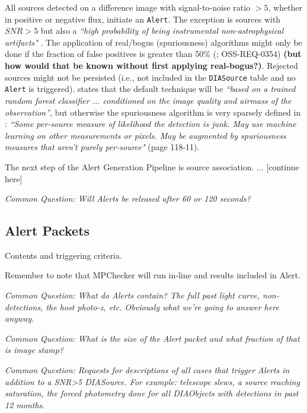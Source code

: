 All sources detected on a difference image with signal-to-noise ratio $>5$, whether in positive or negative flux, initiate an {\tt Alert}. The exception is sources with $SNR>5$ but also a {\it ``high probability of being instrumental non-astrophysical artifacts"} \cite{LSE-163}. The application of real/bogus (spuriousness) algorithms might only be done if the fraction of false positives is greater than 50\% (; OSS-REQ-0354) {\bf (but how would that be known without first applying real-bogus?)}. Rejected sources might not be persisted (i.e., not included in the {\tt DIASource} table and no {\tt Alert} is triggered).  states that the default technique will be {\it ``based on a trained random forest classifier ... conditioned on the image quality and airmass of the observation''}, but otherwise the spuriousness algorithm is very sparsely defined in : {\it ``Some per-source measure of likelihood the detection is junk. May use machine learning on other measurements or pixels. May be augmented by spuriousness measures that aren't purely per-source"} (page 118-11).

The next step of the Alert Generation Pipeline is source association. ... [continue here]



{\it Common Question: Will Alerts be released after 60 or 120 seconds?}


\subsection{Alert Packets}

Contents and triggering criteria.

Remember to note that MPChecker will run in-line and results included in Alert.

{\it Common Question: What do Alerts contain? The full past light curve, non-detections, the host photo-z, etc. Obviously what we're going to answer here anyway.}

{\it Common Question: What is the size of the Alert packet and what fraction of that is image stamp?}

{\it Common Question: Requests for descriptions of all cases that trigger Alerts in addition to a SNR>5 DIASource. For example: telescope slews, a source reaching saturation, the forced photometry done for all DIAObjects with detections in past 12 months.}

